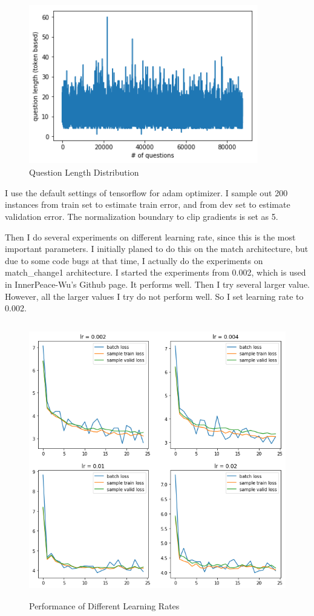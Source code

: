 \documentclass[modernstyle,12pt]{sjsuthesis}
\theoremstyle{definition}
\begin{document}
\begin{figure}[htbp]\centering
  \includegraphics[width=10cm, height=7cm]{figures/question_length.png}
  \caption{Question Length Distribution}
  \label{f:question_length}
\end{figure}

I use the default settings of tensorflow for adam optimizer. I sample out 200 instances from train set to estimate train error, and from dev set to estimate validation error. The normalization boundary to clip gradients is set as 5.

Then I do several experiments on different learning rate, since this is the most important parameters. I initially planed to do this on the match architecture, but due to some code bugs at that time, I actually do the experiments on match\_change1 architecture. I started the experiments from 0.002, which is used in InnerPeace-Wu's Github page. It performs well. Then I try several larger value. However, all the larger values I try do not perform well. So I set learning rate to 0.002.

\begin{figure}[htbp]\centering
  \includegraphics[width=12cm, height=12cm]{figures/lr.png}
  \caption{Performance of Different Learning Rates}
  \label{f:lr}
\end{figure}
\end{document}
